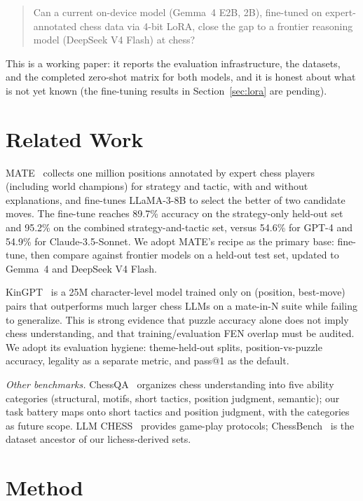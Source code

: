 \documentclass{article}
\begin{document}
\begin{quote}
Can a current on-device model (Gemma~4 E2B, 2B), fine-tuned on
expert-annotated chess data via 4-bit LoRA, close the gap to a frontier
reasoning model (DeepSeek V4 Flash) at chess?
\end{quote}

This is a working paper: it reports the evaluation infrastructure, the
datasets, and the completed zero-shot matrix for both models, and it is
honest about what is not yet known (the fine-tuning results in
Section~\ref{sec:lora} are pending).

\section{Related Work}
\label{sec:related}
MATE~\cite{wang2024mate} collects one million positions annotated by
expert chess players (including world champions) for strategy and
tactic, with and without explanations, and fine-tunes LLaMA-3-8B to
select the better of two candidate moves. The fine-tune reaches 89.7\%
accuracy on the strategy-only held-out set and 95.2\% on the combined
strategy-and-tactic set, versus 54.6\% for GPT-4 and 54.9\% for
Claude-3.5-Sonnet. We adopt MATE's recipe as the primary base:
fine-tune, then compare against frontier models on a held-out test set,
updated to Gemma~4 and DeepSeek V4 Flash.

KinGPT~\cite{tang2026gambit} is a 25M character-level model trained only
on (position, best-move) pairs that outperforms much larger chess LLMs on
a mate-in-N suite while failing to generalize. This is strong evidence
that puzzle accuracy alone does not imply chess understanding, and that
training/evaluation FEN overlap must be audited. We adopt its evaluation
hygiene: theme-held-out splits, position-vs-puzzle accuracy, legality as
a separate metric, and pass@1 as the default.

\emph{Other benchmarks.} ChessQA~\cite{wen2025chessqa} organizes chess
understanding into five ability categories (structural, motifs, short
tactics, position judgment, semantic); our task battery maps onto short
tactics and position judgment, with the categories as future scope.
LLM CHESS~\cite{kolasani2025llmchess} provides game-play protocols;
ChessBench~\cite{ruoss2024chessbench} is the dataset ancestor of our
lichess-derived sets.

\section{Method}
\label{sec:method}
\end{document}
